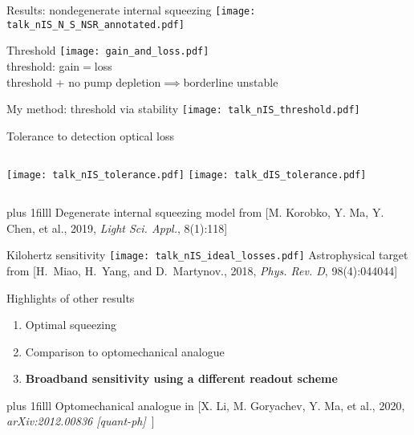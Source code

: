 \documentclass[12pt,xcolor=dvipsnames]{beamer}
\newcommand{\vframefill}{\vskip0pt plus 1filll}
\begin{document}
\begin{frame}{Results: nondegenerate internal squeezing}
\centering
\texttt{[image: talk\_nIS\_N\_S\_NSR\_annotated.pdf]}
\end{frame}

\begin{frame}{Threshold}
\centering
\texttt{[image: gain\_and\_loss.pdf]}
\\\vspace*{1cm}
\large{threshold: gain$=$loss}
\\\vspace*{0.5cm}threshold + no pump depletion$\implies$borderline unstable
\end{frame}

\begin{frame}{My method: threshold via stability}
\centering
\texttt{[image: talk\_nIS\_threshold.pdf]}
\end{frame}

\begin{frame}{Tolerance to detection optical loss}
\begin{columns}
\centering
\texttt{[image: talk\_nIS\_tolerance.pdf]}
\centering
\hspace*{-.3cm}
\texttt{[image: talk\_dIS\_tolerance.pdf]} %
\end{columns}
\vframefill\centering
{\tiny Degenerate internal squeezing model from [M. Korobko, Y. Ma, Y. Chen, et al., 2019, \emph{Light Sci. Appl.}, 8(1):118]}\\
\end{frame}

\begin{frame}{Kilohertz sensitivity}
\centering
\texttt{[image: talk\_nIS\_ideal\_losses.pdf]}
{\tiny\vspace{-0.2cm}Astrophysical target from [H.~Miao, H.~Yang, and D.~Martynov., 2018, \emph{Phys. Rev. D}, 98(4):044044]}
\end{frame}

\begin{frame}{Highlights of other results}
\vspace{2cm}
	\begin{enumerate}
	\item Optimal squeezing
	\item Comparison to optomechanical analogue
	\item \textbf{Broadband sensitivity using a different readout scheme} %
	\end{enumerate}
\vframefill
\centering
{\tiny\vspace{-0.15cm}Optomechanical analogue in [X. Li, M. Goryachev, Y. Ma, et al., 2020, \emph{arXiv:2012.00836 [quant-ph]}\ ]}
\end{frame}
\end{document}
